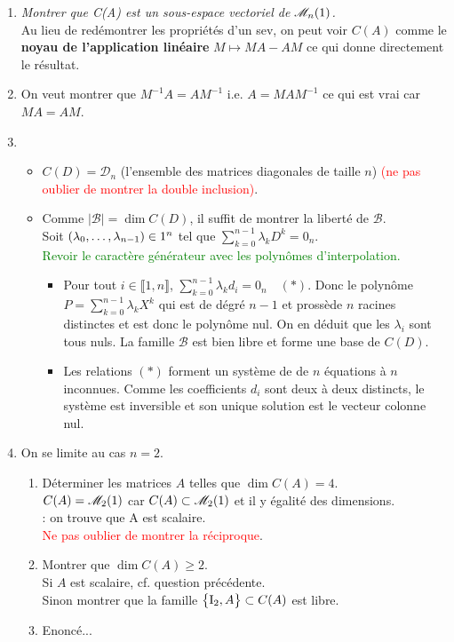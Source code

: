 \begin{enumerate}
    \item \emph{Montrer que C(A) est un sous-espace vectoriel de $\mathscr{M}_n(1)$.} \\
    Au lieu de redémontrer les propriétés d'un sev, on peut voir $C(A)$ comme le \textbf{noyau de l'application linéaire} $M \mapsto MA - AM$ ce qui donne directement le résultat. 
    \item On veut montrer que $M^{-1} A = A M^{-1}$ i.e. $A = M A M^{-1}$ ce qui est vrai car $M A = A M$.
    \item
    \begin{itemize}
        \item $C(D) = \mathscr{D}_n$ (l'ensemble des matrices diagonales de taille $n$) \textcolor{red}{(ne pas oublier de montrer la double inclusion)}.
        \item Comme $| \mathscr{B} | = \dim C(D)$, il suffit de montrer la liberté de $\mathscr{B}$. \\
        Soit $(\lambda_0, \dots, \lambda_{n-1}) \in 1^n$ tel que $\sum\limits_{k=0}^{n-1} \lambda_k D^k = 0_n$. \\
        \textcolor{green}{Revoir le caractère générateur avec les polynômes d'interpolation.}
        \begin{itemize}
            \item Pour tout $i \in \llbracket 1, n \rrbracket$, $\sum\limits_{k=0}^{n-1} \lambda_k d_i = 0_n \quad (*)$. Donc le polynôme $P = \sum\limits_{k=0}^{n-1} \lambda_k X^k$ qui est de dégré $n-1$ et prossède $n$ racines distinctes et est donc le polynôme nul. On en déduit que les $\lambda_i$ sont tous nuls. La famille $\mathscr{B}$ est bien libre et forme une base de $C(D)$.
            \item Les relations $(*)$ forment un système de  de $n$ équations à $n$ inconnues. Comme les coefficients $d_i$ sont deux à deux distincts, le système est inversible et son unique solution est le vecteur colonne nul.
        \end{itemize}
    \end{itemize}
    \item On se limite au cas $n = 2$. 
    \begin{enumerate}
        \item Déterminer les matrices $A$ telles que $\dim C(A) = 4$. \\
        $C(A) = \mathscr{M}_2(1)$ car $C(A) \subset \mathscr{M}_2(1)$ et il y égalité des dimensions. \\
        : on trouve que A est scalaire. \\
        \textcolor{red}{Ne pas oublier de montrer la réciproque}. 
        \item Montrer que $\dim C(A) \geqslant 2$. \\
        Si $A$ est scalaire, cf. question précédente. \\
        Sinon montrer que la famille $\big\{ \mathrm{I}_2, A \big\} \subset C(A)$ est libre. 
        \item Enoncé... \\
    \end{enumerate}
\end{enumerate}